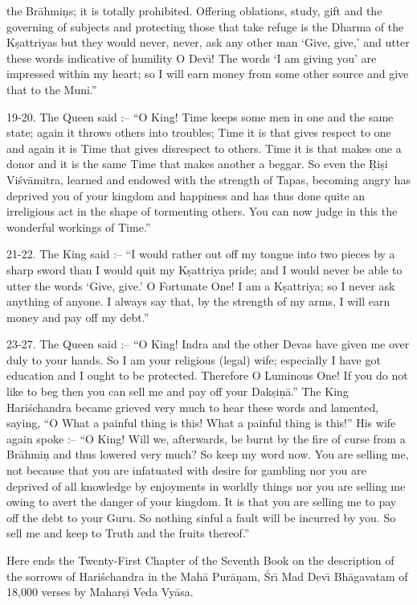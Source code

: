 the Br\=ahmi\d{n}s; it is totally prohibited. Offering oblations, study, gift and the governing of subjects and protecting those that take refuge is the Dharma of the K\d{s}attriyas but they would never, never, ask any other man `Give, give,' and utter these words indicative of humility O Dev\={\i}! The words `I am giving you' are impressed within my heart; so I will earn money from some other source and give that to the Muni.''

19-20. The Queen said :-- ``O King! Time keeps some men in one and the same state; again it throws others into troubles; Time it is that gives respect to one and again it is Time that gives disrespect to others. Time it is that makes one a donor and it is the same Time that makes another a beggar. So even the \d{R}i\d{s}i Vi\'sv\=amitra, learned and endowed with the strength of Tapas, becoming angry has deprived you of your kingdom and happiness and has thus done quite an irreligious act in the shape of tormenting others. You can now judge in this the wonderful workings of Time.''

21-22. The King said :-- ``I would rather out off my tongue into two pieces by a sharp sword than I would quit my K\d{s}attriya pride; and I would never be able to utter the words `Give, give.' O Fortunate One! I am a K\d{s}attriya; so I never ask anything of anyone. I always say that, by the strength of my arms, I will earn money and pay off my debt.''

23-27. The Queen said :-- ``O King! Indra and the other Devas have given me over duly to your hands. So I am your religious (legal) wife; especially I have got education and I ought to be protected. Therefore O Luminous One! If you do not like to beg then you can sell me and pay off your Dak\d{s}i\d{n}\=a.'' The King Hari\'schandra became grieved very much to hear these words and lamented, saying, ``O What a painful thing is this! What a painful thing is this!'' His wife again spoke :-- ``O King! Will we, afterwards, be burnt by the fire of curse from a Br\=ahmi\d{n} and thus lowered very much? So keep my word now. You are selling me, not because that you are infatuated with desire for gambling nor you are deprived of all knowledge by enjoyments in worldly things nor you are selling me owing to avert the danger of your kingdom. It is that you are selling me to pay off the debt to your Guru. So nothing sinful a fault will be incurred by you. So sell me and keep to Truth and the fruits thereof.''

Here ends the Twenty-First Chapter of the Seventh Book on the description of the sorrows of Hari\'schandra in the Mah\=a Pur\=a\d{n}am, \'Sr\={\i} Mad Dev\={\i} Bh\=agavatam of 18,000 verses by Mahar\d{s}i Veda Vy\=asa.



